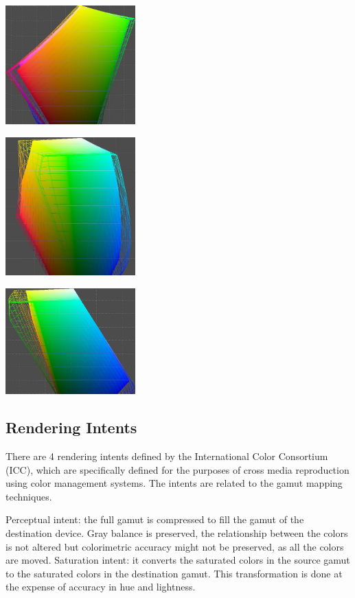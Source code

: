 \documentclass{amsart}
\theoremstyle{definition}
\theoremstyle{remark}
\numberwithin{equation}{section}
\begin{document}
\includegraphics[width=5.0cm]{images/aperio_sRGB_v2.jpg}

\includegraphics[width=5.0cm]{images/aperio_sRGB_v3.jpg}

\includegraphics[width=5.0cm]{images/aperio_sRGB_v4.jpg}

\subsection{Rendering Intents}
There are 4 rendering intents defined by the International Color Consortium (ICC), which are
specifically defined for the purposes of cross media reproduction using color management
systems. The intents are related to the gamut mapping techniques.

Perceptual intent: the full gamut is compressed to fill the gamut of the destination
device. Gray balance is preserved, the relationship between the colors is not altered
but colorimetric accuracy might not be preserved, as all the colors are moved.
Saturation intent: it converts the saturated colors in the source gamut to the saturated
colors in the destination gamut. This transformation is done at the expense of
accuracy in hue and lightness.
\end{document}
